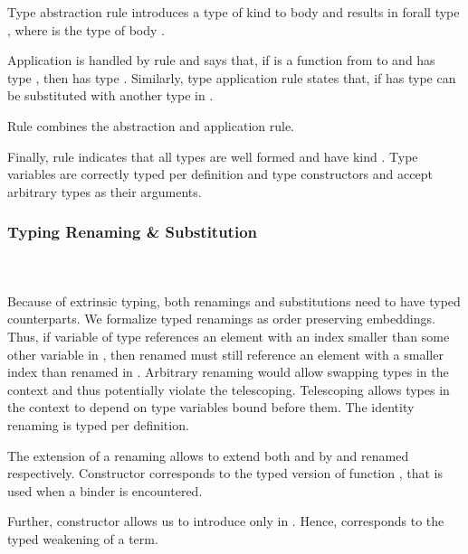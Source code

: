 \noindent Type abstraction rule  introduces a type of kind  to body  and results in forall type  , where  is the type of body . 

\noindent Application is handled by rule  and says that, if  is a function from  to  and  has type , then    has type . Similarly, type application rule  states that, if  has type    can be substituted with another type  in . 

\noindent Rule  combines the abstraction and application rule.

\noindent Finally, rule  indicates that all types  are well formed and have kind . Type variables are correctly typed per definition and type constructors  and  accept arbitrary types as their arguments.

\subsubsection{Typing Renaming \& Substitution}\hfill\\\\
Because of extrinsic typing, both renamings and substitutions need to have typed counterparts.
We formalize typed renamings  as order preserving embeddings. 
Thus, if variable  of type    references an element with an index smaller than some other variable  in , then renamed  must still reference an element with a smaller index than renamed  in .
Arbitrary renaming would allow swapping types in the context and thus potentially violate the telescoping. Telescoping allows types in the context to depend on type variables bound before them.
\FRenTyping
The identity renaming  is typed per definition. 

\noindent The extension of a renaming  allows to extend both  and  by  and renamed  respectively. Constructor  corresponds to the typed version of function , that is used when a binder is encountered. 

\noindent Further, constructor  allows us to introduce  only in . Hence,  corresponds to the typed weakening of a term.

